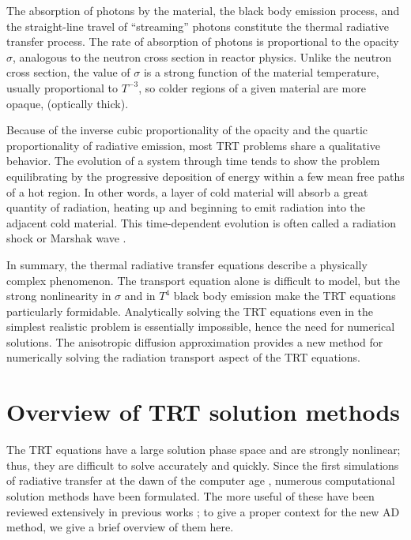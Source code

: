 The absorption of photons by the material, the black body emission process, and
the straight-line travel of ``streaming'' photons constitute the
thermal radiative transfer process. The rate of absorption of photons is
proportional to the opacity $\sigma$, analogous to the neutron cross section in
reactor physics. Unlike the neutron cross section, the value of $\sigma$ is
a strong function of the material temperature, usually proportional to
$T^{-3}$, so colder regions of a given material are more opaque, (optically
thick).

Because of the inverse cubic proportionality of the opacity and the quartic
proportionality of radiative emission, most TRT problems share a qualitative
behavior.  The evolution of a system through time tends to show the problem
equilibrating by the progressive deposition of energy within a few mean free
paths of a hot region.  In other words, a layer of cold material will absorb
a great quantity of radiation, heating up and beginning to emit radiation
into the adjacent cold material. This time-dependent evolution is often called
a radiation shock or Marshak wave \cite{Mar1958}.

In summary, the thermal radiative transfer equations describe a physically
complex phenomenon.  The transport equation alone is difficult to model, but
the strong nonlinearity in $\sigma$ and in $T^4$ black body emission make the
TRT equations particularly formidable.
Analytically solving the TRT equations even in the simplest realistic problem
is essentially impossible, hence the need for numerical solutions.
The anisotropic diffusion approximation provides a new method for numerically
solving the radiation transport aspect of the TRT equations.

\section{Overview of TRT solution methods}

The TRT equations have
a large solution phase space and are strongly nonlinear; thus,
they are difficult to solve accurately and quickly. Since the first
simulations of radiative transfer at the dawn of the computer age
\cite{Cam1964,Cam1969}, numerous computational solution methods have been
formulated.  The more useful of these have been reviewed extensively in previous
works \cite{Cam1964,Cam1969,Ols2000,Bru2002,Cas2004,Wol2008};
to give a proper context for the new AD method, we give a brief overview of
them here.

